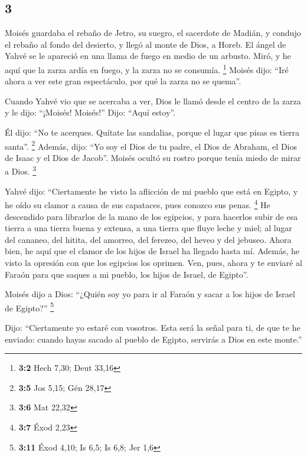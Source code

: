 \begin{paracol}{2}
\hypertarget{section-4}{%
\section{3}\label{section-4}}

 Moisés guardaba el rebaño de Jetro, su suegro, el
sacerdote de Madián, y condujo el rebaño al fondo del desierto, y llegó
al monte de Dios, a Horeb.  El ángel de Yahvé se le
apareció en una llama de fuego en medio de un arbusto. Miró, y he aquí
que la zarza ardía en fuego, y la zarza no se consumía. \footnote{\textbf{3:2}
  Hech 7,30; Deut 33,16}  Moisés dijo: ``Iré ahora a ver
este gran espectáculo, por qué la zarza no se quema''.

 Cuando Yahvé vio que se acercaba a ver, Dios le llamó
desde el centro de la zarza y le dijo: ``¡Moisés! Moisés!'' Dijo: ``Aquí
estoy''.

 Él dijo: ``No te acerques. Quítate las sandalias, porque
el lugar que pisas es tierra santa''. \footnote{\textbf{3:5} Jos 5,15;
  Gén 28,17}  Además, dijo: ``Yo soy el Dios de tu padre,
el Dios de Abraham, el Dios de Isaac y el Dios de Jacob''. Moisés ocultó
su rostro porque tenía miedo de mirar a Dios. \footnote{\textbf{3:6} Mat
  22,32}

 Yahvé dijo: ``Ciertamente he visto la aflicción de mi
pueblo que está en Egipto, y he oído su clamor a causa de sus capataces,
pues conozco sus penas. \footnote{\textbf{3:7} Éxod 2,23} 
He descendido para librarlos de la mano de los egipcios, y para hacerlos
subir de esa tierra a una tierra buena y extensa, a una tierra que fluye
leche y miel; al lugar del cananeo, del hitita, del amorreo, del
ferezeo, del heveo y del jebuseo.  Ahora bien, he aquí que
el clamor de los hijos de Israel ha llegado hasta mí. Además, he visto
la opresión con que los egipcios los oprimen.  Ven, pues,
ahora y te enviaré al Faraón para que saques a mi pueblo, los hijos de
Israel, de Egipto''.

 Moisés dijo a Dios: ``¿Quién soy yo para ir al Faraón y
sacar a los hijos de Israel de Egipto?'' \footnote{\textbf{3:11} Éxod
  4,10; Is 6,5; Is 6,8; Jer 1,6}

 Dijo: ``Ciertamente yo estaré con vosotros. Esta será la
señal para ti, de que te he enviado: cuando hayas sacado al pueblo de
Egipto, servirás a Dios en este monte.''

\hypertarget{la-revelacion-del-nombre-de-dios}{%
}
\end{paracol}
